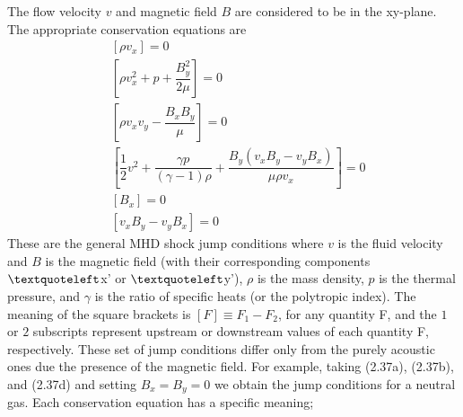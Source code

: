 The flow velocity $v$ and magnetic field $B$ are considered to be in the xy-plane. The appropriate conservation  equations are
\begin{subequations}
\begin{align}
&[\rho v_{x}]=0 \\
&[\rho v_{x}^2+p+\dfrac{B_{y}^2}{2\mu}]=0 \\
&[\rho v_{x}v_{y} - \dfrac{B_{x}B_{y}}{\mu}]=0 \\
&[\dfrac{1}{2}v^2 + \dfrac{\gamma p}{(\gamma-1) \rho}+\dfrac{ B_{y}(v_{x}B_{y} - v_{y}B_{x})}{\mu \rho v_{x}} ]=0 \\
&[B_{x}]=0 \\
&[v_{x}B_{y} - v_{y}B_{x}]=0 
\end{align}
\end{subequations}
These are the general MHD shock jump conditions where $v$ is the fluid velocity and $B$ is the magnetic field (with their corresponding components $\textquoteleft$x' or $\textquoteleft$y'), $\rho$ is the mass density, $p$ is the thermal pressure, and $\gamma$ is the ratio of specific heats (or the polytropic index). The meaning of the square brackets is $[F]\equiv F_{1}-F_{2}$, for any quantity F, and the $1$ or $2$ subscripts represent upstream or downstream values of each quantity F, respectively. These set of jump conditions differ only from the purely acoustic ones due the presence of the magnetic field. For example, taking (2.37a), (2.37b), and (2.37d) and setting $B_{x}=B_{y}=0$ we obtain the jump conditions for a neutral gas. Each conservation equation has a specific meaning; 

